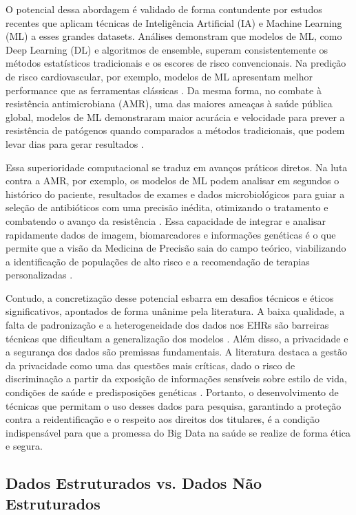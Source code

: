 O potencial dessa abordagem é validado de forma contundente por estudos recentes que aplicam técnicas de Inteligência Artificial (IA) e Machine Learning (ML) a esses grandes datasets. Análises demonstram que modelos de ML, como Deep Learning (DL) e algoritmos de ensemble, superam consistentemente os métodos estatísticos tradicionais e os escores de risco convencionais. Na predição de risco cardiovascular, por exemplo, modelos de ML apresentam melhor performance que as ferramentas clássicas \cite{Liu2025}. Da mesma forma, no combate à resistência antimicrobiana (AMR), uma das maiores ameaças à saúde pública global, modelos de ML demonstraram maior acurácia e velocidade para prever a resistência de patógenos quando comparados a métodos tradicionais, que podem levar dias para gerar resultados \cite{Pennisi2025}.

Essa superioridade computacional se traduz em avanços práticos diretos. Na luta contra a AMR, por exemplo, os modelos de ML podem analisar em segundos o histórico do paciente, resultados de exames e dados microbiológicos para guiar a seleção de antibióticos com uma precisão inédita, otimizando o tratamento e combatendo o avanço da resistência \cite{Pennisi2025}. Essa capacidade de integrar e analisar rapidamente dados de imagem, biomarcadores e informações genéticas é o que permite que a visão da Medicina de Precisão saia do campo teórico, viabilizando a identificação de populações de alto risco e a recomendação de terapias personalizadas \cite{Liu2025, Pennisi2025}.

Contudo, a concretização desse potencial esbarra em desafios técnicos e éticos significativos, apontados de forma unânime pela literatura. A baixa qualidade, a falta de padronização e a heterogeneidade dos dados nos EHRs são barreiras técnicas que dificultam a generalização dos modelos \cite{Liu2025, Pennisi2025}. Além disso, a privacidade e a segurança dos dados são premissas fundamentais. A literatura destaca a gestão da privacidade como uma das questões mais críticas, dado o risco de discriminação a partir da exposição de informações sensíveis sobre estilo de vida, condições de saúde e predisposições genéticas \cite{Belle2015, NationalResearchCouncil2011, Pennisi2025}. Portanto, o desenvolvimento de técnicas que permitam o uso desses dados para pesquisa, garantindo a proteção contra a reidentificação e o respeito aos direitos dos titulares, é a condição indispensável para que a promessa do Big Data na saúde se realize de forma ética e segura.

\subsection{Dados Estruturados vs. Dados Não Estruturados}
\label{subsec:fund-dados-estruturados}

